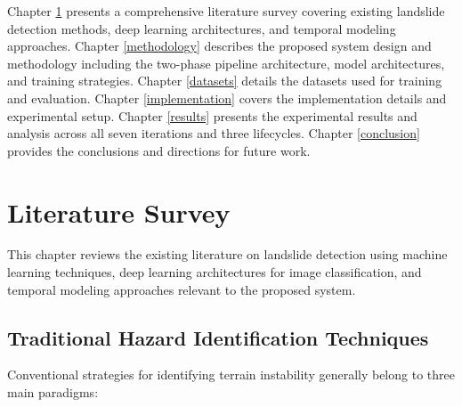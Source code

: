 \documentclass[12pt,a4paper]{report}
\begin{document}
Chapter \ref{litsurvey} presents a comprehensive literature survey covering existing landslide detection methods, deep learning architectures, and temporal modeling approaches. Chapter \ref{methodology} describes the proposed system design and methodology including the two-phase pipeline architecture, model architectures, and training strategies. Chapter \ref{datasets} details the datasets used for training and evaluation. Chapter \ref{implementation} covers the implementation details and experimental setup. Chapter \ref{results} presents the experimental results and analysis across all seven iterations and three lifecycles. Chapter \ref{conclusion} provides the conclusions and directions for future work.

\chapter{Literature Survey}\label{litsurvey}

This chapter reviews the existing literature on landslide detection using machine learning techniques, deep learning architectures for image classification, and temporal modeling approaches relevant to the proposed system.

\section{Traditional Hazard Identification Techniques}
Conventional strategies for identifying terrain instability generally belong to three main paradigms:
\end{document}
